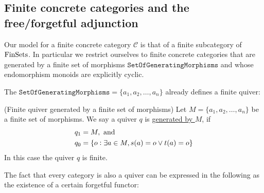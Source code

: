 

\subsection{Finite concrete categories and the free/forgetful adjunction}\label{sec:fin_concrete_cat_free_forgetful}

Our model for a finite concrete category $\mathcal{C}$ is that of a finite subcategory of $\mathrm{FinSets}$. In particular we restrict ourselves
to finite concrete categories that are generated by a finite set of morphisms $\mathtt{SetOfGeneratingMorphisms}$ and whose endomorphism
monoids are explicitly cyclic.

The $\mathtt{SetOfGeneratingMorphisms} = \{ a_{1},a_{2},\dots,a_{n} \}$ already defines a finite quiver:

\begin{definition}{(Finite quiver generated by a finite set of morphisms)}\label{def:quiver_generated}
Let $M = \{ a_{1}, a_{2}, \dots, a_{n} \}$ be a finite set of morphisms. We say a quiver $q$ is \ul{generated by $M$}, if
\begin{align}
q_{1} &= M, \text{ and } \\
q_{0} &= \{ o : \exists a \in M, s(a) = o \vee t(a) = o \}
\end{align}
In this case the quiver $q$ is finite.
\end{definition}

The fact that every category is also a quiver can be expressed in the following as the existence of a certain forgetful functor:

